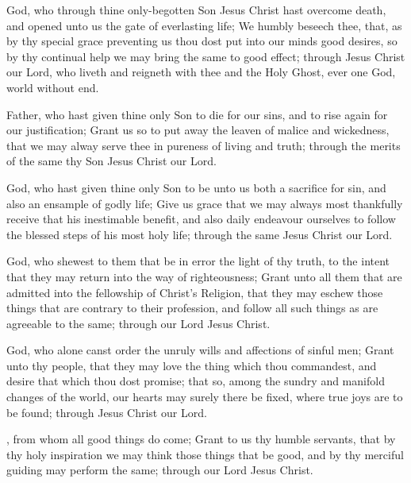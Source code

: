  God, who through thine only-begotten Son Jesus Christ hast overcome death, and opened unto us the gate of everlasting life; We humbly beseech thee, that, as by thy special grace preventing us thou dost put into our minds good desires, so by thy continual help we may bring the same to good effect; through Jesus Christ our Lord, who liveth and reigneth with thee and the Holy Ghost, ever one God, world without end.

 Father, who hast given thine only Son to die for our sins, and to rise again for our justification; Grant us so to put away the leaven of malice and wickedness, that we may alway serve thee in pureness of living and truth; through the merits of the same thy Son Jesus Christ our Lord.

 God, who hast given thine only Son to be unto us both a sacrifice for sin, and also an ensample of godly life; Give us grace that we may always most thankfully receive that his inestimable benefit, and also daily endeavour ourselves to follow the blessed steps of his most holy life; through the same Jesus Christ our Lord.

 God, who shewest to them that be in error the light of thy truth, to the intent that they may return into the way of righteousness; Grant unto all them that are admitted into the fellowship of Christ's Religion, that they may eschew those things that are contrary to their profession, and follow all such things as are agreeable to the same; through our Lord Jesus Christ.

 God, who alone canst order the unruly wills and affections of sinful men; Grant unto thy people, that they may love the thing which thou commandest, and desire that which thou dost promise; that so, among the sundry and manifold changes of the world, our hearts may surely there be fixed, where true joys are to be found; through Jesus Christ our Lord.

, from whom all good things do come; Grant to us thy humble servants, that by thy holy inspiration we may think those things that be good, and by thy merciful guiding may perform the same; through our Lord Jesus Christ.

